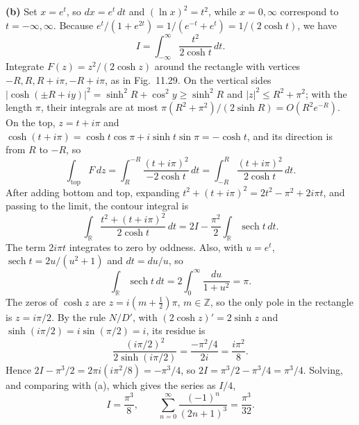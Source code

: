 \textbf{(b)} Set $x=e^t$, so $dx=e^t\,dt$ and $(\ln x)^2=t^2$, while
$x=0,\infty$ correspond to $t=-\infty,\infty$. Because
$e^t/(1+e^{2t})=1/(e^{-t}+e^t)=1/(2\cosh t)$, we have
\[
I=\int_{-\infty}^{\infty}\frac{t^2}{2\cosh t}\,dt.
\]
Integrate $F(z)=z^2/(2\cosh z)$ around the rectangle with vertices
$-R,R,R+i\pi,-R+i\pi$, as in Fig.~11.29. On the vertical sides
$|\cosh(\pm R+iy)|^2=\sinh^2R+\cos^2y\ge\sinh^2R$ and
$|z|^2\le R^2+\pi^2$; with the length $\pi$,
their integrals are at most $\pi(R^2+\pi^2)/(2\sinh R)=O(R^2e^{-R})$.
On the top, $z=t+i\pi$ and
$\cosh(t+i\pi)=\cosh t\cos\pi+i\sinh t\sin\pi=-\cosh t$, and its
direction is from $R$ to $-R$, so
\[
\int_{\text{top}}F\,dz=\int_R^{-R}\frac{(t+i\pi)^2}{-2\cosh t}\,dt
=\int_{-R}^{R}\frac{(t+i\pi)^2}{2\cosh t}\,dt.
\]
After adding bottom and top, expanding
$t^2+(t+i\pi)^2=2t^2-\pi^2+2i\pi t$, and passing to the limit, the
contour integral is
\[
\int_{\mathbb R}\frac{t^2+(t+i\pi)^2}{2\cosh t}\,dt
=2I-\frac{\pi^2}{2}\int_{\mathbb R}\operatorname{sech}t\,dt.
\]
The term $2i\pi t$ integrates to zero by oddness. Also, with $u=e^t$,
$\operatorname{sech}t=2u/(u^2+1)$ and $dt=du/u$, so
\[
\int_{\mathbb R}\operatorname{sech}t\,dt
=2\int_0^\infty\frac{du}{1+u^2}=\pi.
\]
The zeros of $\cosh z$ are $z=i(m+\frac12)\pi$, $m\in\mathbb Z$, so
the only pole in the rectangle is $z=i\pi/2$. By the rule $N/D'$, with
$(2\cosh z)'=2\sinh z$ and $\sinh(i\pi/2)=i\sin(\pi/2)=i$, its residue is
\[
\frac{(i\pi/2)^2}{2\sinh(i\pi/2)}
=\frac{-\pi^2/4}{2i}=\frac{i\pi^2}{8}.
\]
Hence $2I-\pi^3/2=2\pi i(i\pi^2/8)=-\pi^3/4$, so
$2I=\pi^3/2-\pi^3/4=\pi^3/4$.
Solving, and comparing with (a), which gives the series as $I/4$,
\[
\boxed{I=\frac{\pi^3}{8}},\qquad
\sum_{n=0}^{\infty}\frac{(-1)^n}{(2n+1)^3}=\frac{\pi^3}{32}.
\]

